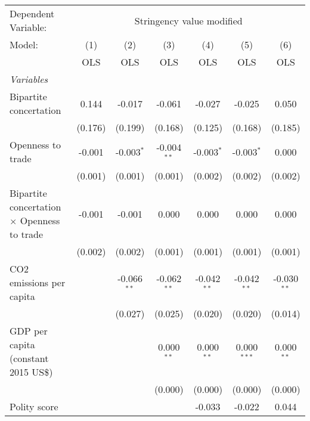 
\begingroup
\centering
\begin{tabular}{lcccccc}
   \toprule
   Dependent Variable: & \multicolumn{6}{c}{Stringency value modified}\\
   Model:                                             & (1)     & (2)           & (3)           & (4)           & (5)           & (6)\\  
                                                      &  OLS    & OLS           & OLS           & OLS           & OLS           & OLS\\  
   \midrule
   \emph{Variables}\\
   Bipartite concertation                             & 0.144   & -0.017        & -0.061        & -0.027        & -0.025        & 0.050\\   
                                                      & (0.176) & (0.199)       & (0.168)       & (0.125)       & (0.168)       & (0.185)\\   
   Openness to trade                                  & -0.001  & -0.003$^{*}$  & -0.004$^{**}$ & -0.003$^{*}$  & -0.003$^{*}$  & 0.000\\   
                                                      & (0.001) & (0.001)       & (0.001)       & (0.002)       & (0.002)       & (0.002)\\   
   Bipartite concertation $\times$ Openness to trade  & -0.001  & -0.001        & 0.000         & 0.000         & 0.000         & 0.000\\   
                                                      & (0.002) & (0.002)       & (0.001)       & (0.001)       & (0.001)       & (0.001)\\   
   CO2 emissions per capita                           &         & -0.066$^{**}$ & -0.062$^{**}$ & -0.042$^{**}$ & -0.042$^{**}$ & -0.030$^{**}$\\   
                                                      &         & (0.027)       & (0.025)       & (0.020)       & (0.020)       & (0.014)\\   
   GDP per capita (constant 2015 US\$)                &         &               & 0.000$^{**}$  & 0.000$^{**}$  & 0.000$^{***}$ & 0.000$^{**}$\\   
                                                      &         &               & (0.000)       & (0.000)       & (0.000)       & (0.000)\\   
   Polity score                                       &         &               &               & -0.033        & -0.022        & 0.044\\   

\end{tabular}
